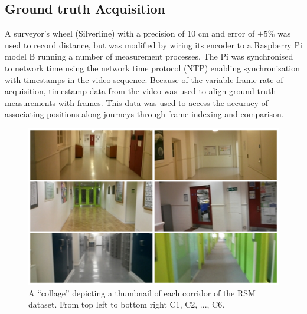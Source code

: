 \subsection{Ground truth Acquisition}

A surveyor's wheel (Silverline) with a precision of 10 cm and error of $\pm 5\%$ was used to record distance, but was modified by wiring its encoder to a Raspberry Pi model B running a number of measurement processes. The Pi was synchronised to network time using the network time protocol (NTP) enabling synchronisation with timestamps in the video sequence.  Because of the variable-frame rate of acquisition, timestamp data from the video was used to align ground-truth measurements with frames. This data was used to access the accuracy of associating positions along journeys through frame indexing and comparison.


\begin{figure}[t]
\centering
\includegraphics[width=\linewidth]{./gfx/Chapter04/rsm_collage.jpg}
\caption{A ``collage'' depicting a thumbnail of each corridor of the RSM dataset. From top left to bottom right C1, C2, ..., C6.}
\label{fig:RSMcollage}
\end{figure}


